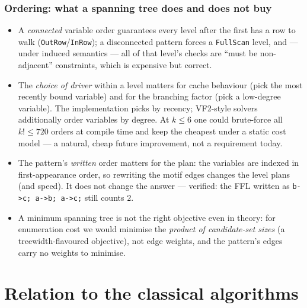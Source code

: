 \documentclass[11pt,a4paper]{article}
\newcommand{\code}[1]{\texttt{#1}}
\begin{document}
\section{Ordering: what a spanning tree does and does not buy}

\begin{itemize}
  \item A \emph{connected} variable order guarantees every level after the first
        has a row to walk (\code{OutRow}/\code{InRow}); a disconnected pattern
        forces a \code{FullScan} level, and --- under induced semantics --- all of
        that level's checks are ``must be non-adjacent'' constraints, which is
        expensive but correct.
  \item The \emph{choice of driver} within a level matters for cache behaviour
        (pick the most recently bound variable) and for the branching factor
        (pick a low-degree variable). The implementation picks by recency;
        VF2-style solvers additionally order variables by degree. At $k\le6$ one
        could brute-force all $k!\le720$ orders at compile time and keep the
        cheapest under a static cost model --- a natural, cheap future
        improvement, not a requirement today.
  \item The pattern's \emph{written} order matters for the plan: the variables are
        indexed in first-appearance order, so rewriting the motif edges changes
        the level plans (and speed). It does not change the answer --- verified:
        the FFL written as \code{b->c; a->b; a->c;} still counts $2$.
  \item A minimum spanning tree is not the right objective even in theory: for
        enumeration cost we would minimise the \emph{product of candidate-set
        sizes} (a treewidth-flavoured objective), not edge weights, and the
        pattern's edges carry no weights to minimise.
\end{itemize}

\part{Relation to the classical algorithms}
\end{document}

